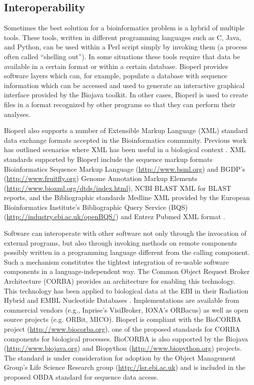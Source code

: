\documentclass[12pt]{article}
\begin{document}
\subsection{Interoperability}

Sometimes the best solution for a bioinformatics problem is a hybrid
of multiple tools.  These tools, written in different programming
languages such as C, Java, and Python, can be used within a Perl
script simply by invoking them (a process often called ``shelling
out'').  In some situations these tools require that data be available
in a certain format or within a certain database.  Bioperl provides
software layers which can, for example, populate a database with
sequence information which can be accessed and used to generate an
interactive graphical interface provided by the Biojava toolkit.
In other cases, Bioperl is used to create files in a format recognized
by other programs so that they can perform their analyses. 

Bioperl also supports a number of Extensible Markup Language (XML) 
standard data exchange formats accepted in the Bioinformatics
community.  Previous work has outlined scenarios
where XML has been useful in a biological context
\cite{xmlbioinformatics}.  XML standards supported by Bioperl
include the sequence markup formats Bioinformatics Sequence Markup
Language (\url{http://www.bsml.org}) and BGDP's
(\url{http://www.fruitfly.org}) Genome Annotation Markup Elements
(\url{http://www.bioxml.org/dtds/index.html}), NCBI BLAST XML for
BLAST reports, and the Bibliographic standards Medline XML provided
by the European Bioinformatics Institute's Bibliographic 
Query Service (BQS) (\url{http://industry.ebi.ac.uk/openBQS/}) and 
Entrez Pubmed XML format \cite{entrez}.

Software can interoperate with other software not only through the
invocation of external programs, but also through invoking methods on
remote components possibly written in a programming language different
from the calling component.  Such a mechanism constitutes the tightest
integration of re-usable software components in a language-independent
way.  The Common Object Request Broker Architecture (CORBA)
\cite{corba} provides an architecture for enabling this technology.
This technology has been applied to biological data at the EBI in
their Radiation Hybrid \cite{rhdb} and EMBL Nucleotide Databases
\cite{embl-corba}.  Implementations are available from commercial
vendors (e.g., Inprise's VisiBroker, IONA's ORBacus) as well as open
source projects (e.g. ORBit, MICO).  Bioperl is compliant with the
BioCORBA project (\url{http://www.biocorba.org}), one of the proposed
standards for CORBA components for biological processes.  BioCORBA is
also supported by the Biojava (\url{http://www.biojava.org}) and
Biopython (\url{http://www.biopython.org}) projects.  The standard is
under consideration for adoption by the Object Management Group's Life
Science Research group (\url{http://lsr.ebi.ac.uk}) and is included
in the proposed OBDA standard for sequence data access.
\end{document}

